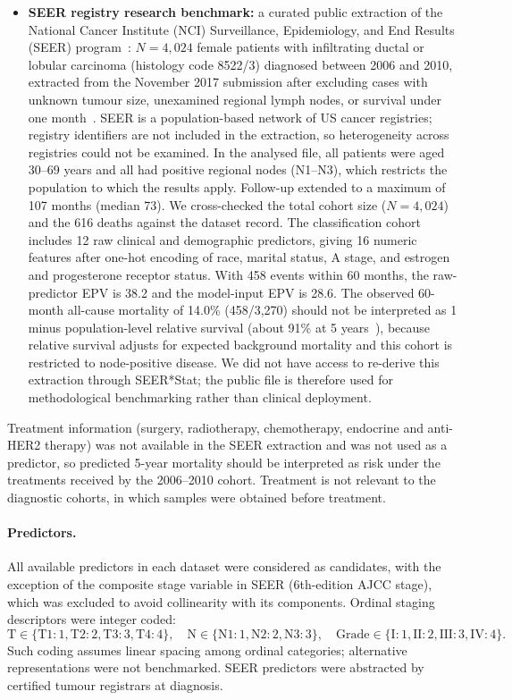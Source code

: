 \documentclass[11pt,a4paper]{article}
\begin{document}
\begin{itemize}
\item \textbf{SEER registry research benchmark:} a curated public extraction of the National Cancer Institute (NCI) Surveillance, Epidemiology, and End Results (SEER) program~\cite{namdari2019,seer2026}: $N=4{,}024$ female patients with infiltrating ductal or lobular carcinoma (histology code 8522/3) diagnosed between 2006 and 2010, extracted from the November 2017 submission after excluding cases with unknown tumour size, unexamined regional lymph nodes, or survival under one month~\cite{namdari2019,amartey2024}. SEER is a population-based network of US cancer registries; registry identifiers are not included in the extraction, so heterogeneity across registries could not be examined. In the analysed file, all patients were aged 30--69 years and all had positive regional nodes (N1--N3), which restricts the population to which the results apply. Follow-up extended to a maximum of 107 months (median 73). We cross-checked the total cohort size ($N=4{,}024$) and the 616 deaths against the dataset record. The classification cohort includes 12 raw clinical and demographic predictors, giving 16 numeric features after one-hot encoding of race, marital status, A stage, and estrogen and progesterone receptor status. With 458 events within 60 months, the raw-predictor EPV is 38.2 and the model-input EPV is 28.6. The observed 60-month all-cause mortality of 14.0\% (458/3,270) should not be interpreted as 1 minus population-level relative survival (about 91\% at 5 years~\cite{acs2024}), because relative survival adjusts for expected background mortality and this cohort is restricted to node-positive disease. We did not have access to re-derive this extraction through SEER*Stat; the public file is therefore used for methodological benchmarking rather than clinical deployment.
\end{itemize}

Treatment information (surgery, radiotherapy, chemotherapy, endocrine and anti-HER2 therapy) was not available in the SEER extraction and was not used as a predictor, so predicted 5-year mortality should be interpreted as risk under the treatments received by the 2006--2010 cohort. Treatment is not relevant to the diagnostic cohorts, in which samples were obtained before treatment.

\paragraph{Predictors.} All available predictors in each dataset were considered as candidates, with the exception of the composite stage variable in SEER (6th-edition AJCC stage), which was excluded to avoid collinearity with its components. Ordinal staging descriptors were integer coded:
\begin{equation}
\text{T} \in \{\text{T1}{:}1,\text{T2}{:}2,\text{T3}{:}3,\text{T4}{:}4\},\quad
\text{N} \in \{\text{N1}{:}1,\text{N2}{:}2,\text{N3}{:}3\},\quad
\text{Grade} \in \{\text{I}{:}1,\text{II}{:}2,\text{III}{:}3,\text{IV}{:}4\}.
\end{equation}
Such coding assumes linear spacing among ordinal categories; alternative representations were not benchmarked. SEER predictors were abstracted by certified tumour registrars at diagnosis.
\end{document}
